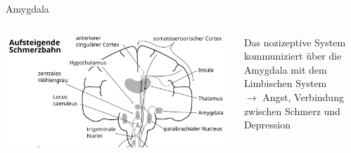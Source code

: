 \documentclass{beamer}
\begin{document}
\begin{frame}{Amygdala}
    
    \begin{columns}[c]
    
    \begin{column}{6cm}
    
    \begin{center}
        \includegraphics[width=\textwidth]{Schmerz_aufsteigend_Gehirn.png}
    
    \end{center}
    
    \end{column}

    \begin{column}{5cm}

Das nozizeptive System kommuniziert über die Amygdala mit dem Limbischen System  \\ [0.5 cm]

\(\rightarrow\) \pause Angst, Verbindung zwischen Schmerz und Depression


    
    \end{column}

    
    \end{columns}
    
\end{frame}





\end{document}
